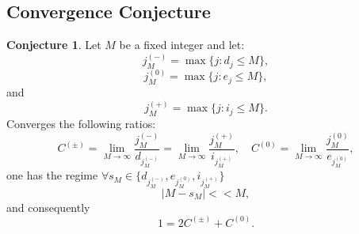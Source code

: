 \documentclass[]{article}
\theoremstyle{plain}%
\theoremstyle{definition}
\newtheorem{conj}{Conjecture}[section]
\theoremstyle{remark}
\begin{document}
\subsection {Convergence Conjecture}
\begin{conj}
	Let $M$ be a fixed integer and let:
	$$ j^{(-)}_M = \max \{ j :  d_j\le M\},$$
	$$ j^{(0)}_M = \max \{ j :  e_j\le M\},$$
	and
	$$ j^{(+)}_M = \max \{ j :  i_j\le M\}.$$
	Converges the following ratios:
	$$ C^{(\pm)} = \lim_{M \to \infty} \frac{j^{(-)}_M}{d_{j^{(-)}_M}} = \lim_{M \to \infty}\frac{j^{(+)}_M}{i_{j^{(+)}_M}}, \quad C^{(0)} = \lim_{M \to \infty} \frac{j^{(0)}_M}{e_{j^{(0)}_M}},$$
	one has the regime $ \forall s_M \in \{d_{j^{(-)}_M},e_{j^{(0)}_M},i_{j^{(+)}_M}\} $
	$$ |M-s_M| << M, $$
	and consequently
	$$ 1 = 2C^{(\pm)} +C^{(0)}.$$
\end{conj}
\end{document}
